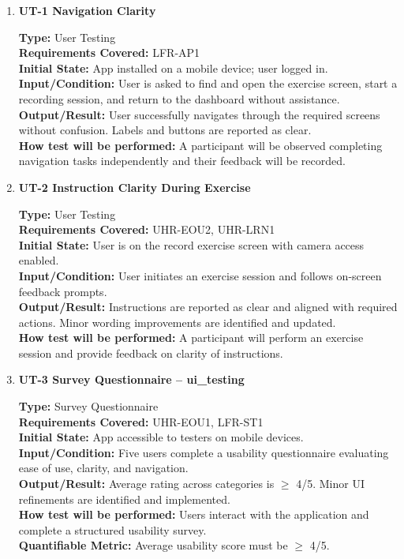 \documentclass[12pt, titlepage]{article}
\begin{document}
\begin{enumerate}

\item \textbf{UT-1 Navigation Clarity}

\textbf{Type:} User Testing \\
\textbf{Requirements Covered:} LFR-AP1 \\
\textbf{Initial State:} App installed on a mobile device; user logged in. \\
\textbf{Input/Condition:} User is asked to find and open the exercise screen, start a recording session, and return to the dashboard without assistance. \\
\textbf{Output/Result:} User successfully navigates through the required screens without confusion. Labels and buttons are reported as clear. \\
\textbf{How test will be performed:} A participant will be observed completing navigation tasks independently and their feedback will be recorded. \\

\vspace{0.5em}

\item \textbf{UT-2 Instruction Clarity During Exercise}

\textbf{Type:} User Testing \\
\textbf{Requirements Covered:} UHR-EOU2, UHR-LRN1 \\
\textbf{Initial State:} User is on the record exercise screen with camera access enabled. \\
\textbf{Input/Condition:} User initiates an exercise session and follows on-screen feedback prompts. \\
\textbf{Output/Result:} Instructions are reported as clear and aligned with required actions. Minor wording improvements are identified and updated. \\
\textbf{How test will be performed:} A participant will perform an exercise session and provide feedback on clarity of instructions. \\

\vspace{0.5em}

\item \textbf{UT-3 Survey Questionnaire -- ui\_testing}

\textbf{Type:} Survey Questionnaire\\
\textbf{Requirements Covered:} UHR-EOU1, LFR-ST1 \\
\textbf{Initial State:} App accessible to testers on mobile devices. \\
\textbf{Input/Condition:} Five users complete a usability questionnaire evaluating ease of use, clarity, and navigation. \\
\textbf{Output/Result:} Average rating across categories is $\geq$ 4/5. Minor UI refinements are identified and implemented. \\
\textbf{How test will be performed:} Users interact with the application and complete a structured usability survey. \\
\textbf{Quantifiable Metric:} Average usability score must be $\geq$ 4/5. \\


\end{enumerate}
\end{document}
